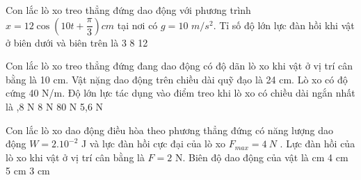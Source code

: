 
\begin{ex}%
Con lắc lò xo treo thẳng đứng dao động với phương trình $x=12\cos  \left( 10t+\dfrac{\pi}{3} \right)cm$ tại nơi có $g = 10$ $m/s^2$. Tỉ số độ lớn lực đàn hồi khi vật ở biên dưới và biên trên là
\choice
{3}
{8}
{}
{12}

\end{ex} 

\begin{ex}%
Con lắc lò xo treo thẳng đứng đang dao động có độ dãn lò xo khi vật ở vị trí cân bằng là 10 cm. Vật nặng dao động trên chiều dài quỹ đạo là 24 cm. Lò xo có độ cứng 40 N/m. Độ lớn lực tác dụng vào điểm treo khi lò xo có chiều dài ngắn nhất là
\choice
{,8 N}
{8 N}
{80 N}
{5,6 N}
\end{ex} 



\begin{ex}%
Con lắc lò xo dao động điều hòa theo phương thẳng đứng có năng lượng dao động $W=2.10^{-2}$ J và lực đàn hồi cực đại của lò xo $F_{max}=4\ N$ . Lực đàn hồi của lò xo khi vật ở vị trí cân bằng là $F = 2$ N. Biên độ dao động của vật là
\choice
{ cm}
{4 cm}
{5 cm}
{3 cm}
\end{ex} 




